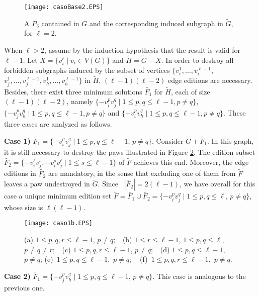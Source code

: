 \documentclass[12pt]{article}
\begin{document}
\begin{figure}[htb]
\centering
\texttt{[image: casoBase2.EPS]}
\caption{\label{casobase} A $P_3$ contained in $G$ and the corresponding induced subgraph in $\widetilde{G}$, for $\ell=2$.}
\end{figure}

When $\ell>2$, assume by the induction hypothesis that the result is valid for $\ell -1$. Let $X=\{v_i^\ell \mid v_i \in V(G)\}$ and $\widetilde{H} =  \widetilde{G} - X$. In order to destroy all forbidden subgraphs induced by the subset of vertices $\{v_i^1,\ldots,v_i^{\ell-1}$, $ v_j^1,\ldots,v_j^{\ell-1}, v_h^1,\ldots,v_h^{\ell-1}\}$ in $\widetilde{H}$, $(\ell-1)(\ell-2)$ edge editions are necessary. Besides, there exist three minimum solutions $\widetilde{F_1}$ for $\widetilde{H}$, each of size $(\ell-1)(\ell-2)$, namely $\{-v_i^p v_j^q \mid 1 \leq p,q \leq \ell-1, p\not=q\}$, $\{-v_j^p v_h^q \mid 1 \leq p,q \leq \ell-1, p\not=q\}$ and $\{+v_i^p v_h^q \mid 1 \leq p,q \leq \ell-1, p\not=q\}$. These three cases are analyzed as follows.


\noindent
\textbf{Case 1)} $\widetilde{F_1}= \{-v_i^p v_j^q \mid 1 \leq p,q \leq \ell-1$, $p\not=q\}$. Consider $\widetilde{G} + \widetilde{F_1}$. In this graph, it is still necessary to destroy the paws illustrated in Figure \ref{caso1}. The edition subset $\widetilde{F_2}=\{-v_i^\ell v_j^s, -v_i^s v_j^{\ell} \mid 1 \leq s \leq \ell-1\}$ of $\widetilde{F}$ achieves this end. Moreover, the edge editions in $\widetilde{F_2}$ are mandatory, in the sense that excluding one of them from $\widetilde{F}$ leaves a paw undestroyed in $\widetilde{G}$. Since \  $|\widetilde{F_2}|=2(\ell-1)$, we have overall for this case a unique minimum edition set $\widetilde{F} = \widetilde{F_1} \cup \widetilde{F_2} = \{-v_i^p v_j^q \mid 1 \leq p,q \leq \ell$, $p\not=q\}$, whose size is $\ell(\ell-1)$.

\begin{figure}[htb]
\centering
\texttt{[image: caso1b.EPS]}
\caption{\label{caso1}(a) $1 \leq p,q,r \leq \ell-1$, $p\not=q; \;\;$ (b) $1 \leq r \leq \ell-1$, $1 \leq p,q \leq \ell$, $p\not=q\not=r; \;\;$ (c) $1 \leq p,q,r \leq \ell-1$, $p\not=q; \;\;$ (d) $1 \leq p,q \leq \ell-1$, $p\not=q$;  \mbox{(e) $1 \leq p,q \leq \ell-1$, $p\not=q; \;\;$ (f) $1 \leq p,q,r \leq \ell-1$, $p\not=q$}.}
\end{figure}

\noindent
\textbf{Case 2)} $\widetilde{F_1}= \{-v_j^p v_h^q \mid 1 \leq p,q \leq \ell-1$, $p\not=q\}$. This case is analogous to the previous one.
\end{document}
